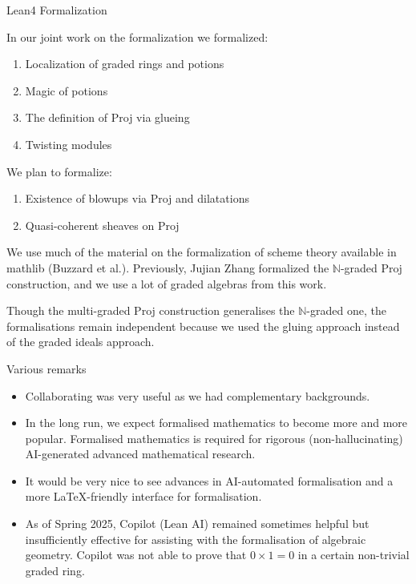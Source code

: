 \documentclass[9pt]{beamer}
\begin{document}
\begin{frame}{Lean4 Formalization}

In our joint work on the formalization we formalized: 
\begin{enumerate}
\item Localization of graded rings and potions

\item Magic of potions 

\item The definition of Proj via glueing 

\item Twisting modules
\end{enumerate}
We plan to formalize:

\begin{enumerate} \item Existence of blowups via Proj and dilatations 
\item Quasi-coherent sheaves on Proj
\end{enumerate}



We use much of the material on the formalization of scheme theory available in mathlib (Buzzard et al.).
Previously, Jujian Zhang formalized the $\mathbb{N}$-graded $\mathrm{Proj}$ construction, and we use a lot of graded algebras from this work. 



 Though the multi-graded Proj construction generalises the $\mathbb{N}$-graded one, the formalisations remain independent because we used the gluing approach instead of the graded ideals approach. 


\end{frame}




\begin{frame}{Various remarks}
\begin{itemize}

\item Collaborating was very useful as we had complementary backgrounds.
  
\item In the long run, we expect formalised mathematics to become more and more popular. Formalised mathematics is required for rigorous (non-hallucinating) AI-generated advanced mathematical research.  
  
\item It would be very nice to see advances in AI-automated formalisation and a more \LaTeX-friendly interface for formalisation.
  
\item As of Spring 2025, Copilot (Lean AI) remained sometimes helpful but insufficiently effective for assisting with the formalisation of algebraic geometry. Copilot was not able to prove that $0 \times 1 = 0$ in a certain non-trivial graded ring.

\end{itemize}


\end{frame}
\end{document}
